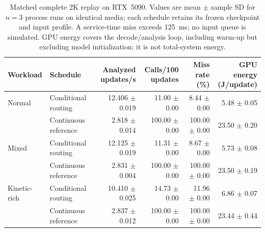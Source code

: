 \begin{table}[t]
\caption{Matched complete 2K replay on RTX~5090. Values are mean $\pm$ sample SD for $n=3$ process runs on identical media; each schedule retains its frozen checkpoint and input profile. A service-time miss exceeds 125~ms; no input queue is simulated. GPU energy covers the decode/analysis loop, including warm-up but excluding model initialization; it is not total-system energy.}
\label{tab:matched_replay}
\centering
\scriptsize
\setlength{\tabcolsep}{3pt}
\begin{tabular}{@{}llrrrr@{}}
\toprule
Workload & Schedule & \shortstack{Analyzed\\updates/s} & \shortstack{Calls/100\\updates} & \shortstack{Miss rate\\(\%)} & \shortstack{GPU energy\\(J/update)}\\
\midrule
Normal & Conditional routing & 12.406 $\pm$ 0.019 & 11.00 $\pm$ 0.00 & 8.44 $\pm$ 0.00 & 5.48 $\pm$ 0.05\\
 & Continuous reference & 2.818 $\pm$ 0.014 & 100.00 $\pm$ 0.00 & 100.00 $\pm$ 0.00 & 23.50 $\pm$ 0.20\\
\addlinespace
Mixed & Conditional routing & 12.125 $\pm$ 0.019 & 11.31 $\pm$ 0.00 & 8.67 $\pm$ 0.00 & 5.73 $\pm$ 0.08\\
 & Continuous reference & 2.831 $\pm$ 0.004 & 100.00 $\pm$ 0.00 & 100.00 $\pm$ 0.00 & 23.50 $\pm$ 0.19\\
\addlinespace
Kinetic-rich & Conditional routing & 10.410 $\pm$ 0.025 & 14.73 $\pm$ 0.00 & 11.96 $\pm$ 0.00 & 6.86 $\pm$ 0.07\\
 & Continuous reference & 2.837 $\pm$ 0.012 & 100.00 $\pm$ 0.00 & 100.00 $\pm$ 0.00 & 23.44 $\pm$ 0.44\\
\bottomrule
\end{tabular}
\end{table}
